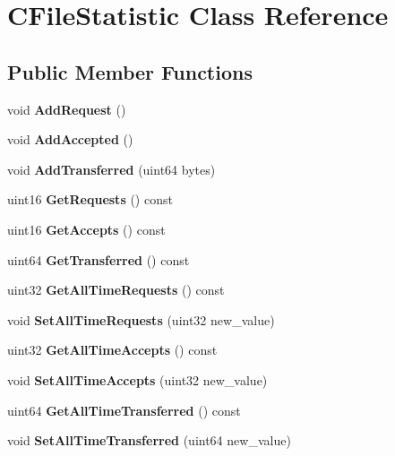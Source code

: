 \section{CFileStatistic Class Reference}
\label{classCFileStatistic}
\subsection*{Public Member Functions}
\begin{DoxyCompactItemize}
\item 
void {\bfseries AddRequest} ()\label{classCFileStatistic_ac41d86b5584dcab1659ab46cdedeb753}

\item 
void {\bfseries AddAccepted} ()\label{classCFileStatistic_a38bd2d1ff2f5ad24f7f9d1ef7ad0e531}

\item 
void {\bfseries AddTransferred} (uint64 bytes)\label{classCFileStatistic_a17ca56b5d8e43527f74ff0fb98d5e056}

\item 
uint16 {\bfseries GetRequests} () const \label{classCFileStatistic_a477e10ff32abee7d7c6255a875e31bbb}

\item 
uint16 {\bfseries GetAccepts} () const \label{classCFileStatistic_af285b3b9756d8719bdf167a68716249e}

\item 
uint64 {\bfseries GetTransferred} () const \label{classCFileStatistic_a671a7e7694993817b410c8786093b932}

\item 
uint32 {\bfseries GetAllTimeRequests} () const \label{classCFileStatistic_a6efc8bbe912ecbba8b1b179238cd9a64}

\item 
void {\bfseries SetAllTimeRequests} (uint32 new\_\-value)\label{classCFileStatistic_a231e0446020f744aff94eca118b3dd7f}

\item 
uint32 {\bfseries GetAllTimeAccepts} () const \label{classCFileStatistic_aa2b44fab7da2ff4917a4fa336f137338}

\item 
void {\bfseries SetAllTimeAccepts} (uint32 new\_\-value)\label{classCFileStatistic_a19c6b731850e2aeed63183e0889482b5}

\item 
uint64 {\bfseries GetAllTimeTransferred} () const \label{classCFileStatistic_a8188478e9b6898806af98a496445d9e1}

\item 
void {\bfseries SetAllTimeTransferred} (uint64 new\_\-value)\label{classCFileStatistic_a3a47156947f47c97e44777856924829a}

\end{DoxyCompactItemize}
